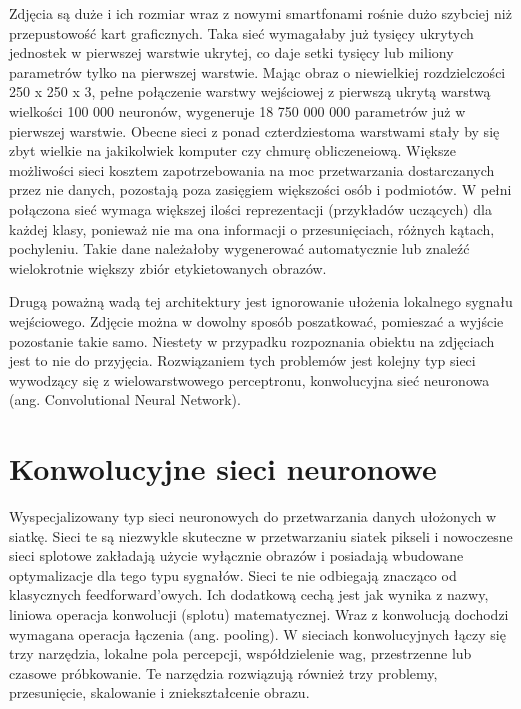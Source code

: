 \documentclass[12pt,a4paper,twoside,titlepage,openright]{book}
\begin{document}
Zdjęcia są duże i ich rozmiar wraz z nowymi smartfonami rośnie dużo szybciej niż przepustowość kart graficznych. Taka sieć wymagałaby już tysięcy ukrytych jednostek w pierwszej warstwie ukrytej, co daje setki tysięcy lub miliony parametrów tylko na pierwszej warstwie. Mając obraz o niewielkiej rozdzielczości 250 x 250 x 3, pełne połączenie warstwy wejściowej z pierwszą ukrytą warstwą wielkości 100 000 neuronów, wygeneruje 18 750 000 000 parametrów już w pierwszej warstwie. Obecne sieci z ponad czterdziestoma warstwami stały by się zbyt wielkie na jakikolwiek komputer czy chmurę obliczeneiową. Większe możliwości sieci kosztem zapotrzebowania na moc przetwarzania dostarczanych przez nie danych, pozostają poza zasięgiem większości osób i podmiotów. W pełni połączona sieć wymaga większej ilości reprezentacji (przykładów uczących) dla każdej klasy, ponieważ nie ma ona informacji o przesunięciach, różnych kątach, pochyleniu. Takie dane należałoby wygenerować automatycznie lub znaleźć wielokrotnie większy zbiór etykietowanych obrazów.

Drugą poważną wadą tej architektury jest ignorowanie ułożenia lokalnego sygnału wejściowego. Zdjęcie można w dowolny sposób poszatkować, pomieszać a wyjście pozostanie takie samo. Niestety w przypadku rozpoznania obiektu na zdjęciach jest to nie do przyjęcia. Rozwiązaniem tych problemów jest kolejny typ sieci wywodzący się z wielowarstwowego perceptronu, konwolucyjna sieć neuronowa  (ang. Convolutional Neural Network).

\section{Konwolucyjne sieci neuronowe}
Wyspecjalizowany typ sieci neuronowych do przetwarzania danych ułożonych w siatkę. Sieci te są niezwykle skuteczne w przetwarzaniu siatek pikseli i nowoczesne sieci splotowe zakładają użycie wyłącznie obrazów i posiadają wbudowane optymalizacje dla tego typu sygnałów. Sieci te nie odbiegają znacząco od klasycznych feedforward'owych. Ich dodatkową cechą jest jak wynika z nazwy, liniowa operacja konwolucji (splotu) matematycznej. Wraz z konwolucją dochodzi wymagana operacja łączenia (ang. pooling).  W sieciach konwolucyjnych łączy się trzy narzędzia, lokalne pola percepcji, współdzielenie wag, przestrzenne lub czasowe próbkowanie. Te narzędzia rozwiązują również trzy problemy, przesunięcie, skalowanie i zniekształcenie obrazu.
\end{document}
